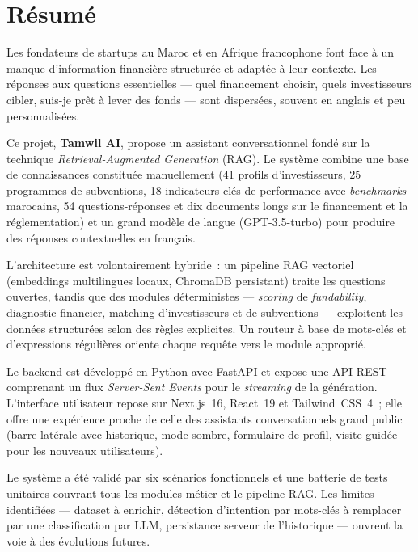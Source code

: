 \chapter*{Résumé}
\thispagestyle{plain}

Les fondateurs de startups au Maroc et en Afrique francophone font face à un manque d'information financière structurée et adaptée à leur contexte. Les réponses aux questions essentielles --- quel financement choisir, quels investisseurs cibler, suis-je prêt à lever des fonds --- sont dispersées, souvent en anglais et peu personnalisées.

Ce projet, \textbf{Tamwil AI}, propose un assistant conversationnel fondé sur la technique \textit{Retrieval-Augmented Generation} (RAG). Le système combine une base de connaissances constituée manuellement (41 profils d'investisseurs, 25 programmes de subventions, 18 indicateurs clés de performance avec \textit{benchmarks} marocains, 54 questions-réponses et dix documents longs sur le financement et la réglementation) et un grand modèle de langue (GPT-3.5-turbo) pour produire des réponses contextuelles en français.

L'architecture est volontairement hybride~: un pipeline RAG vectoriel (embeddings multilingues locaux, ChromaDB persistant) traite les questions ouvertes, tandis que des modules déterministes --- \textit{scoring} de \textit{fundability}, diagnostic financier, matching d'investisseurs et de subventions --- exploitent les données structurées selon des règles explicites. Un routeur à base de mots-clés et d'expressions régulières oriente chaque requête vers le module approprié.

Le backend est développé en Python avec FastAPI et expose une API REST comprenant un flux \textit{Server-Sent Events} pour le \textit{streaming} de la génération. L'interface utilisateur repose sur Next.js~16, React~19 et Tailwind~CSS~4~; elle offre une expérience proche de celle des assistants conversationnels grand public (barre latérale avec historique, mode sombre, formulaire de profil, visite guidée pour les nouveaux utilisateurs).

Le système a été validé par six scénarios fonctionnels et une batterie de tests unitaires couvrant tous les modules métier et le pipeline RAG. Les limites identifiées --- dataset à enrichir, détection d'intention par mots-clés à remplacer par une classification par LLM, persistance serveur de l'historique --- ouvrent la voie à des évolutions futures.

